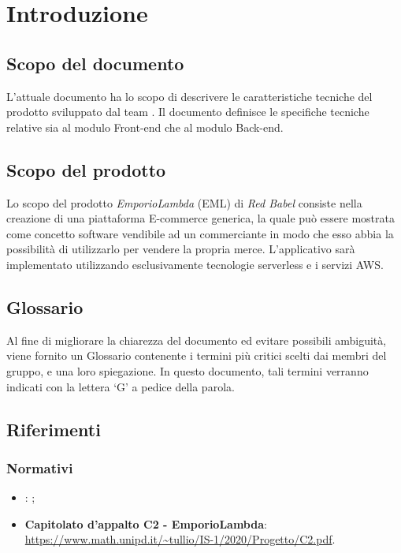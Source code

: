 \section{Introduzione}
\subsection{Scopo del documento}
L'attuale documento ha lo scopo di descrivere le caratteristiche tecniche del prodotto \nameproject{} sviluppato dal team \Omicron. Il documento definisce le specifiche tecniche relative sia al modulo Front-end che al modulo Back-end.
\subsection{Scopo del prodotto}
Lo scopo del prodotto \textit{EmporioLambda} (EML) di \textit{Red Babel} consiste nella creazione di una piattaforma E-commerce generica, la quale può essere mostrata come concetto software vendibile ad un commerciante in modo che esso abbia la possibilità di utilizzarlo per vendere la propria merce. L'applicativo sarà implementato utilizzando esclusivamente tecnologie serverless e i servizi AWS.
\subsection{Glossario}
Al fine di migliorare la chiarezza del documento ed evitare possibili ambiguità, viene fornito un Glossario contenente i termini più critici scelti dai membri del gruppo, e una loro spiegazione. In questo documento, tali termini verranno indicati con la lettera `G' a pedice della parola.
\subsection{Riferimenti}
\subsubsection{Normativi}
\begin{itemize}
	\item \textbf{\NdP}: ;
	\item \textbf{Capitolato d'appalto C2 - EmporioLambda}: \\ \url{https://www.math.unipd.it/~tullio/IS-1/2020/Progetto/C2.pdf}.
\end{itemize}

